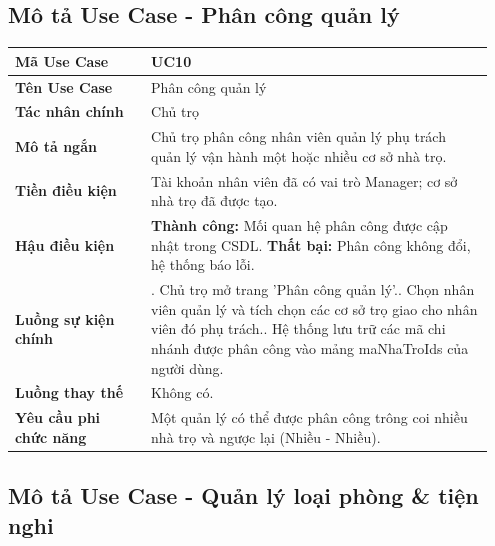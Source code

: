 \documentclass[a4paper,oneside]{report}
\begin{document}
\subsection{Mô tả Use Case - Phân công quản lý}

\begin{longtable}[]{@{}>{\RaggedRight\arraybackslash}p{0.27\linewidth}>{\RaggedRight\arraybackslash}p{0.68\linewidth}@{}}
\toprule
\textbf{Mã Use Case} & UC10\tabularnewline
\midrule
\endhead
\textbf{Tên Use Case} & Phân công quản lý\tabularnewline
\textbf{Tác nhân chính} & Chủ trọ\tabularnewline
\textbf{Mô tả ngắn} & Chủ trọ phân công nhân viên quản lý phụ trách quản
lý vận hành một hoặc nhiều cơ sở nhà trọ.\tabularnewline
\textbf{Tiền điều kiện} & Tài khoản nhân viên đã có vai trò Manager; cơ
sở nhà trọ đã được tạo.\tabularnewline
\textbf{Hậu điều kiện} & \textbf{Thành công:} Mối quan hệ phân công được cập nhật trong CSDL.\newline 
\textbf{Thất bại:} Phân công không đổi, hệ thống báo lỗi.\tabularnewline
\textbf{Luồng sự kiện chính} & 1. Chủ trọ mở trang
'Phân công quản lý'.\newline 2. Chọn nhân viên quản lý và tích chọn
các cơ sở trọ giao cho nhân viên đó phụ trách.\newline 3. Hệ thống
lưu trữ các mã chi nhánh được phân công vào mảng maNhaTroIds của người
dùng.\tabularnewline
\textbf{Luồng thay thế} & Không có.\tabularnewline
\textbf{Yêu cầu phi chức năng} & Một quản lý có thể được phân công trông
coi nhiều nhà trọ và ngược lại (Nhiều - Nhiều).\tabularnewline
\bottomrule
\end{longtable}

\subsection{Mô tả Use Case - Quản lý loại phòng \& tiện nghi}
\end{document}
